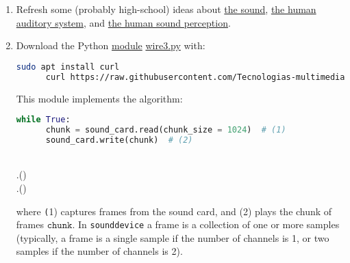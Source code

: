 \begin{enumerate}

\item Refresh some (probably high-school) ideas about
  \href{https://vicente-gonzalez-ruiz.github.io/the_sound/}{the
    sound}, \href{https://vicente-gonzalez-ruiz.github.io/human_auditory_system/}{the
    human auditory system},
    and \href{https://vicente-gonzalez-ruiz.github.io/human_sound_perception/}{the
    human sound perception}. %
  
\item Download the Python
  \href{https://docs.python.org/3/tutorial/modules.html}{module}
  \href{https://raw.githubusercontent.com/Tecnologias-multimedia/intercom/master/test/sounddevice/wire3.py}{wire3.py} with:

  \begin{lstlisting}[language=Bash]
      sudo apt install curl
      curl https://raw.githubusercontent.com/Tecnologias-multimedia/intercom/master/test/sounddevice/wire3.py > wire3.py
  \end{lstlisting}      
      
  This module implements the algorithm:

  \begin{lstlisting}[language=Python]
    while True:
      chunk = sound_card.read(chunk_size = 1024)  # (1)
      sound_card.write(chunk)  # (2)
  \end{lstlisting}
  
  \begin{pseudocode}[display]{}{}
    \BEGIN
       \\
      \WHILE \TRUE
      \BEGIN
         \GETS {}.() \\
        .() 
      \END
    \END
  \end{pseudocode}

  where {\texttt (1)} captures {} frames from the sound
  card, and (2) plays the chunk of frames
  $\mathtt{chunk}$. In \texttt{sounddevice} a frame is a collection of
  one or more samples (typically, a frame is a single sample if the
  number of channels is 1, or two samples if the number of channels is
  2).


\end{enumerate}
